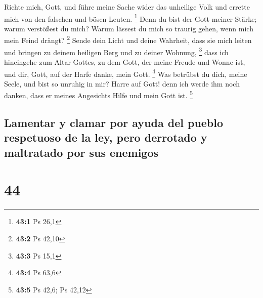  Richte mich, Gott, und führe meine Sache wider das
unheilige Volk und errette mich von den falschen und bösen Leuten.
\footnote{\textbf{43:1} Ps 26,1}  Denn du bist der Gott
meiner Stärke; warum verstößest du mich? Warum lässest du mich so
traurig gehen, wenn mich mein Feind drängt? \footnote{\textbf{43:2} Ps
  42,10}  Sende dein Licht und deine Wahrheit, dass sie
mich leiten und bringen zu deinem heiligen Berg und zu deiner Wohnung,
\footnote{\textbf{43:3} Ps 15,1}  dass ich hineingehe zum
Altar Gottes, zu dem Gott, der meine Freude und Wonne ist, und dir,
Gott, auf der Harfe danke, mein Gott. \footnote{\textbf{43:4} Ps 63,6}
 Was betrübst du dich, meine Seele, und bist so unruhig in
mir? Harre auf Gott! denn ich werde ihm noch danken, dass er meines
Angesichts Hilfe und mein Gott ist. \footnote{\textbf{43:5} Ps 42,6; Ps
  42,12}

\hypertarget{lamentar-y-clamar-por-ayuda-del-pueblo-respetuoso-de-la-ley-pero-derrotado-y-maltratado-por-sus-enemigos}{%
\subsection{Lamentar y clamar por ayuda del pueblo respetuoso de la ley,
pero derrotado y maltratado por sus
enemigos}\label{lamentar-y-clamar-por-ayuda-del-pueblo-respetuoso-de-la-ley-pero-derrotado-y-maltratado-por-sus-enemigos}}

\hypertarget{section-43}{%
\section{44}\label{section-43}}

